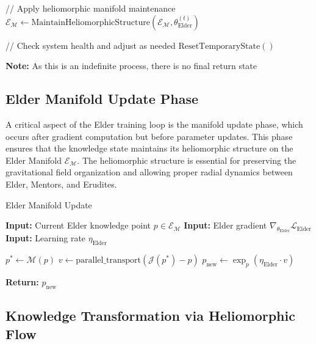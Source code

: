 \begin{algorithm}
\begin{algorithmic}[1]
    \State // Apply heliomorphic manifold maintenance
    \State $\mathcal{E}_{\mathcal{M}} \gets \text{MaintainHeliomorphicStructure}(\mathcal{E}_{\mathcal{M}}, \theta_{\text{Elder}}^{(t)})$
    
    \State // Check system health and adjust as needed
        \State $\text{ResetTemporaryState}()$ 
    \EndIf
\EndWhile

\State \textbf{Note:} As this is an indefinite process, there is no final return state
\end{algorithmic}
\end{algorithm}

\subsection{Elder Manifold Update Phase}

A critical aspect of the Elder training loop is the manifold update phase, which occurs after gradient computation but before parameter updates. This phase ensures that the knowledge state maintains its heliomorphic structure on the Elder Manifold $\mathcal{E}_{\mathcal{M}}$. The heliomorphic structure is essential for preserving the gravitational field organization and allowing proper radial dynamics between Elder, Mentors, and Erudites.

\begin{algorithm}
\caption{Elder Manifold Update}
\begin{algorithmic}[1]
\State \textbf{Input:} Current Elder knowledge point $p \in \mathcal{E}_{\mathcal{M}}$
\State \textbf{Input:} Elder gradient $\nabla_{\theta_{\text{Elder}}} \mathcal{L}_{\text{Elder}}$
\State \textbf{Input:} Learning rate $\eta_{\text{Elder}}$

\State $p^* \gets \mathcal{M}(p)$ 
\State $v \gets \text{parallel\_transport}(\mathcal{J}(p^*) - p)$ 
\State $p_{\text{new}} \gets \exp_p(\eta_{\text{Elder}} \cdot v)$ 

\State \textbf{Return:} $p_{\text{new}}$
\end{algorithmic}
\end{algorithm}

\subsection{Knowledge Transformation via Heliomorphic Flow}

